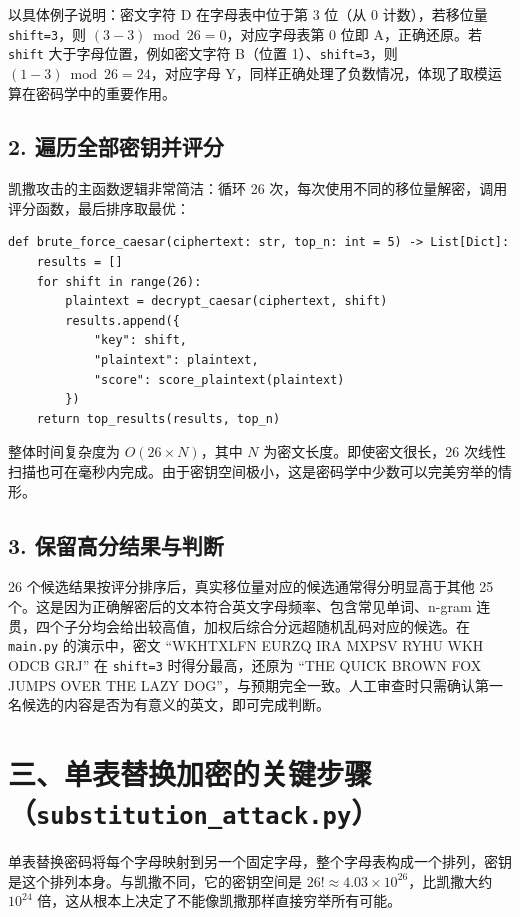 \documentclass[12pt, a4paper]{article}
\begin{document}
以具体例子说明：密文字符 D 在字母表中位于第 3 位（从 0 计数），若移位量 \texttt{shift=3}，则 $(3-3)\bmod 26=0$，对应字母表第 0 位即 A，正确还原。若 \texttt{shift} 大于字母位置，例如密文字符 B（位置 1）、\texttt{shift=3}，则 $(1-3)\bmod 26=24$，对应字母 Y，同样正确处理了负数情况，体现了取模运算在密码学中的重要作用。

\subsection{2. 遍历全部密钥并评分}

凯撒攻击的主函数逻辑非常简洁：循环 26 次，每次使用不同的移位量解密，调用评分函数，最后排序取最优：

\begin{lstlisting}[style=python, caption={凯撒穷举攻击函数（caesar\_attack.py）}]
def brute_force_caesar(ciphertext: str, top_n: int = 5) -> List[Dict]:
    results = []
    for shift in range(26):
        plaintext = decrypt_caesar(ciphertext, shift)
        results.append({
            "key": shift,
            "plaintext": plaintext,
            "score": score_plaintext(plaintext)
        })
    return top_results(results, top_n)
\end{lstlisting}

整体时间复杂度为 $O(26 \times N)$，其中 $N$ 为密文长度。即使密文很长，26 次线性扫描也可在毫秒内完成。由于密钥空间极小，这是密码学中少数可以完美穷举的情形。

\subsection{3. 保留高分结果与判断}

26 个候选结果按评分排序后，真实移位量对应的候选通常得分明显高于其他 25 个。这是因为正确解密后的文本符合英文字母频率、包含常见单词、n-gram 连贯，四个子分均会给出较高值，加权后综合分远超随机乱码对应的候选。在 \texttt{main.py} 的演示中，密文 ``WKHTXLFN EURZQ IRA MXPSV RYHU WKH ODCB GRJ'' 在 \texttt{shift=3} 时得分最高，还原为 ``THE QUICK BROWN FOX JUMPS OVER THE LAZY DOG''，与预期完全一致。人工审查时只需确认第一名候选的内容是否为有意义的英文，即可完成判断。

\section{三、单表替换加密的关键步骤（\texttt{substitution\_attack.py}）}

单表替换密码将每个字母映射到另一个固定字母，整个字母表构成一个排列，密钥是这个排列本身。与凯撒不同，它的密钥空间是 $26! \approx 4.03\times10^{26}$，比凯撒大约 $10^{24}$ 倍，这从根本上决定了不能像凯撒那样直接穷举所有可能。
\end{document}
